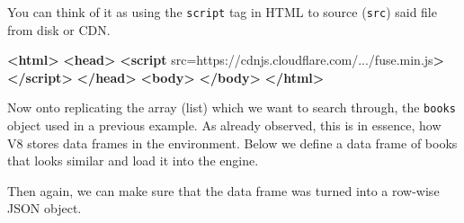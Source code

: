 \documentclass[
  10pt,
]{krantz}
\makeatletter
\newenvironment{Shaded}{\begin{snugshade}}{\end{snugshade}}
\newcommand{\CommentTok}[1]{\textcolor[rgb]{0.37,0.37,0.37}{\textit{#1}}}
\newcommand{\DataTypeTok}[1]{\textcolor[rgb]{0.27,0.27,0.27}{#1}}
\newcommand{\KeywordTok}[1]{\textcolor[rgb]{0.27,0.27,0.27}{\textbf{#1}}}
\newcommand{\NormalTok}[1]{#1}
\newcommand{\OperatorTok}[1]{\textcolor[rgb]{0.43,0.43,0.43}{\textbf{#1}}}
\newcommand{\OtherTok}[1]{\textcolor[rgb]{0.37,0.37,0.37}{#1}}
\newcommand{\StringTok}[1]{\textcolor[rgb]{0.5,0.5,0.5}{#1}}
\newenvironment{kframe}{%
\medskip{}
\setlength{\fboxsep}{.8em}
 \def\at@end@of@kframe{}%
 \ifinner\ifhmode%
  \def\at@end@of@kframe{\end{minipage}}%
  \begin{minipage}{\columnwidth}%
 \fi\fi%
 \def\FrameCommand##1{\hskip\@totalleftmargin \hskip-\fboxsep
 \colorbox{shadecolor}{##1}\hskip-\fboxsep
     \hskip-\linewidth \hskip-\@totalleftmargin \hskip\columnwidth}%
 \MakeFramed {\advance\hsize-\width
   \@totalleftmargin\z@ \linewidth\hsize
   \@setminipage}}%
 {\par\unskip\endMakeFramed%
 \at@end@of@kframe}
\renewenvironment{Shaded}{\begin{kframe}}{\end{kframe}}
\makeatother
\begin{document}
You can think of it as using the \texttt{script} tag in HTML to source (\texttt{src}) said file from disk or CDN.

\begin{Shaded}
\begin{Highlighting}[]
\KeywordTok{<html>}
  \KeywordTok{<head>}
    \KeywordTok{<script} 
\OtherTok{      src=}\StringTok{\textquotesingle{}https://cdnjs.cloudflare.com/.../fuse.min.js\textquotesingle{}}\KeywordTok{>}
    \KeywordTok{</script>}
  \KeywordTok{</head>}
  \KeywordTok{<body>}
  \KeywordTok{</body>}
\KeywordTok{</html>}
\end{Highlighting}
\end{Shaded}

Now onto replicating the array (list) which we want to search through, the \texttt{books} object used in a previous example. As already observed, this is in essence, how V8 stores data frames in the environment. Below we define a data frame of books that looks similar and load it into the engine.

\begin{Shaded}
\end{Shaded}

Then again, we can make sure that the data frame was turned into a row-wise JSON object.

\begin{Shaded}
\end{Shaded}
\end{document}
